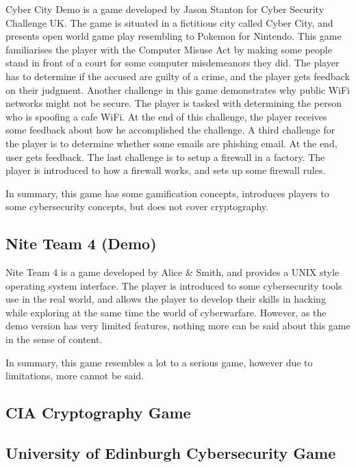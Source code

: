 \documentclass{l4proj}
\begin{document}
Cyber City Demo is a game developed by Jason Stanton for Cyber Security Challenge UK.
The game is situated in a fictitious city called Cyber City, and presents open world game play resembling to Pokemon for Nintendo.
This game familiarises the player with the Computer Misuse Act by making some people stand in front of a court for some computer misdemeanors they did.
The player has to determine if the accused are guilty of a crime, and the player gets feedback on their judgment.
Another challenge in this game demonstrates why public WiFi networks might not be secure. The player is tasked with determining the person who is spoofing a cafe WiFi.
At the end of this challenge, the player receives some feedback about how he accomplished the challenge.
A third challenge for the player is to determine whether some emails are phishing email. At the end, user gets feedback.
The last challenge is to setup a firewall in a factory. The player is introduced to how a firewall works, and sets up some firewall rules.

In summary, this game has some gamification concepts, introduces players to some cybersecurity concepts, but does not cover cryptography.

\subsection{Nite Team 4 (Demo)}

Nite Team 4 is a game developed by Alice \& Smith, and provides a UNIX style operating system interface. 
The player is introduced to some cybersecurity tools use in the real world, 
and allows the player to develop their skills in hacking while exploring at the same time the world of cyberwarfare.
However, as the demo version has very limited features, nothing more can be said about this game in the sense of content.

In summary, this game resembles a lot to a serious game, however due to limitations, more cannot be said.

\subsection{CIA Cryptography Game}



\subsection{University of Edinburgh Cybersecurity Game}
\end{document}
